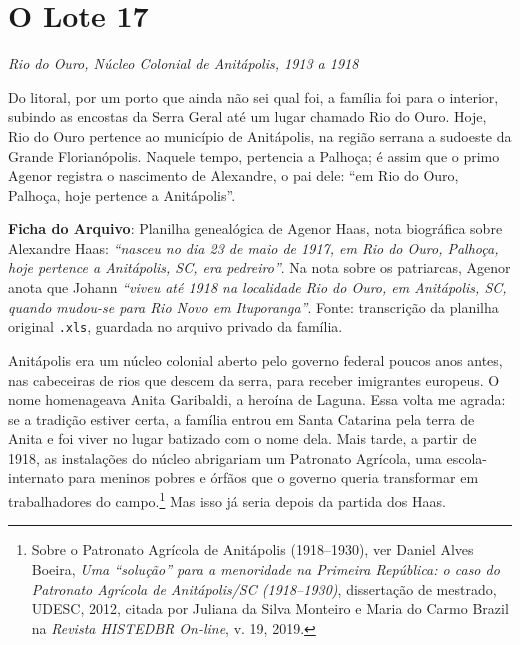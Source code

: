 \documentclass[
  brazilian,
  11pt,
  openany]{book}
\begin{document}
\section{O Lote 17}\label{o-lote-17}

\emph{Rio do Ouro, Núcleo Colonial de Anitápolis, 1913 a 1918}

Do litoral, por um porto que ainda não sei qual foi, a família foi para
o interior, subindo as encostas da Serra Geral até um lugar chamado Rio
do Ouro. Hoje, Rio do Ouro pertence ao município de Anitápolis, na
região serrana a sudoeste da Grande Florianópolis. Naquele tempo,
pertencia a Palhoça; é assim que o primo Agenor registra o nascimento de
Alexandre, o pai dele: ``em Rio do Ouro, Palhoça, hoje pertence a
Anitápolis''.

\begin{ficha}

\textbf{Ficha do Arquivo}: Planilha genealógica de Agenor Haas, nota
biográfica sobre Alexandre Haas: \emph{``nasceu no dia 23 de maio de
1917, em Rio do Ouro, Palhoça, hoje pertence a Anitápolis, SC, era
pedreiro''}. Na nota sobre os patriarcas, Agenor anota que Johann
\emph{``viveu até 1918 na localidade Rio do Ouro, em Anitápolis, SC,
quando mudou-se para Rio Novo em Ituporanga''}. Fonte: transcrição da
planilha original \texttt{.xls}, guardada no arquivo privado da família.

\end{ficha}

Anitápolis era um núcleo colonial aberto pelo governo federal poucos
anos antes, nas cabeceiras de rios que descem da serra, para receber
imigrantes europeus. O nome homenageava Anita Garibaldi, a heroína de
Laguna. Essa volta me agrada: se a tradição estiver certa, a família
entrou em Santa Catarina pela terra de Anita e foi viver no lugar
batizado com o nome dela. Mais tarde, a partir de 1918, as instalações
do núcleo abrigariam um Patronato Agrícola, uma escola-internato para
meninos pobres e órfãos que o governo queria transformar em
trabalhadores do campo.\footnote{Sobre o Patronato Agrícola de
  Anitápolis (1918--1930), ver Daniel Alves Boeira, \emph{Uma
  ``solução'' para a menoridade na Primeira República: o caso do
  Patronato Agrícola de Anitápolis/SC (1918--1930)}, dissertação de
  mestrado, UDESC, 2012, citada por Juliana da Silva Monteiro e Maria do
  Carmo Brazil na \emph{Revista HISTEDBR On-line}, v. 19, 2019.} Mas
isso já seria depois da partida dos Haas.
\end{document}
